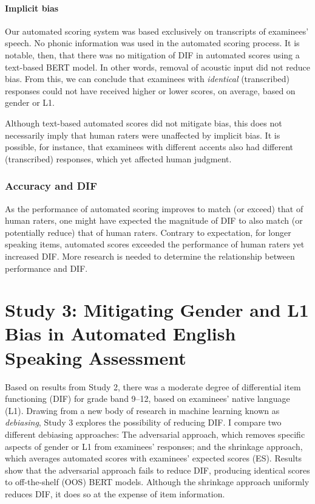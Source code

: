 \documentclass [PhD] {uclathes}
\begin{document}
\subsubsection{Implicit bias}

Our automated scoring system was based exclusively on transcripts of examinees’ speech. No phonic information was used in the automated scoring process. It is notable, then, that there was no mitigation of DIF in automated scores using a text-based BERT model. In other words, removal of acoustic input did not reduce bias. From this, we can conclude that examinees with \emph{identical} (transcribed) responses could not have received higher or lower scores, on average, based on gender or L1. 

Although text-based automated scores did not mitigate bias, this does not necessarily imply that human raters were unaffected by implicit bias. It is possible, for instance, that examinees with different accents also had different (transcribed) responses, which yet affected human judgment. 

\subsection{Accuracy and DIF}

As the performance of automated scoring improves to match (or exceed) that of human raters, one might have expected the magnitude of DIF to also match (or potentially reduce) that of human raters. Contrary to expectation, for longer speaking items, automated scores exceeded the performance of human raters yet increased DIF. More research is needed to determine the relationship between performance and DIF. 



\chapter{Study 3: Mitigating Gender and L1 Bias in Automated English Speaking Assessment}
\label{study3}

Based on results from Study 2, there was a moderate degree of differential item functioning (DIF) for grade band 9–12, based on examinees’ native language (L1). Drawing from a new body of research in machine learning known as \emph{debiasing}, Study 3 explores the possibility of reducing DIF. I compare two different debiasing approaches: The adversarial approach, which removes specific aspects of gender or L1 from examinees’ responses; and the shrinkage approach, which averages automated scores with examinees’ expected scores (ES). Results show that the adversarial approach fails to reduce DIF, producing identical scores to off-the-shelf (OOS) BERT models. Although the shrinkage approach uniformly reduces DIF, it does so at the expense of item information. 
\end{document}
